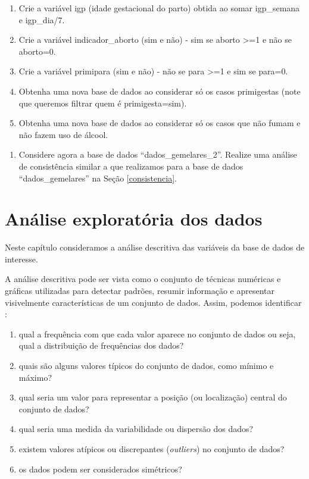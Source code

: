 \documentclass[
]{book}
\providecommand{\tightlist}{%
  \setlength{\itemsep}{0pt}\setlength{\parskip}{0pt}}
\begin{document}
\begin{enumerate}
\def\labelenumi{\alph{enumi}.}
\item
  Crie a variável igp (idade gestacional do parto)
  obtida ao somar igp\_semana e igp\_dia/7.
\item
  Crie a variável indicador\_aborto (sim e não) - sim se aborto \textgreater=1 e não se aborto=0.
\item
  Crie a variável primipara (sim e não) - não se para \textgreater=1 e sim se para=0.
\item
  Obtenha uma nova base de dados ao considerar só os casos primigestas (note que queremos filtrar quem é primigesta=sim).
\item
  Obtenha uma nova base de dados ao considerar só os casos que não fumam e não fazem uso de álcool.
\end{enumerate}

\begin{enumerate}
\def\labelenumi{\arabic{enumi}.}
\setcounter{enumi}{5}
\tightlist
\item
  Considere agora a base de dados ``dados\_gemelares\_2''. Realize uma análise de consistência similar a que realizamos para a base de dados ``dados\_gemelares'' na Seção \ref{consistencia}.
\end{enumerate}

\hypertarget{anuxe1lise-exploratuxf3ria-dos-dados}{%
\chapter{Análise exploratória dos dados}\label{anuxe1lise-exploratuxf3ria-dos-dados}}

Neste capítulo consideramos a análise descritiva das variáveis da base de dados de interesse.

A análise descritiva pode ser vista como o conjunto de técnicas numéricas e gráficas utilizadas para detectar padrões, resumir informação e apresentar visivelmente características de um conjunto de dados. Assim, podemos identificar \citep{morettin2020introduccaoa}:

\begin{enumerate}
\def\labelenumi{\roman{enumi})}
\item
  qual a frequência com que cada valor aparece no conjunto de dados ou seja, qual a distribuição de frequências dos
  dados?
\item
  quais são alguns valores típicos do conjunto de dados, como mínimo e máximo?
\item
  qual seria um valor para representar a posição (ou localização) central do conjunto de dados?
\item
  qual seria uma medida da variabilidade ou dispersão dos dados?
\item
  existem valores atípicos ou discrepantes (\emph{outliers}) no conjunto de dados?
\item
  os dados podem ser considerados simétricos?
\end{enumerate}
\end{document}
